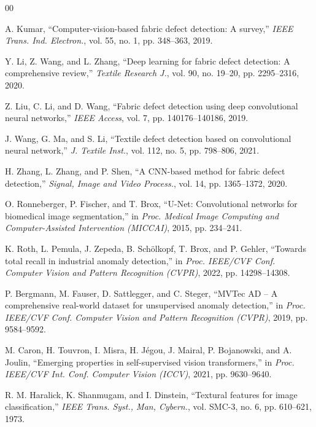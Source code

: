 \documentclass[journal]{IEEEtran}
\begin{document}
\balance
\begin{thebibliography}{00}

A. Kumar, ``Computer-vision-based fabric defect detection: A survey,'' \textit{IEEE Trans. Ind. Electron.}, vol. 55, no. 1, pp. 348--363, 2019.

Y. Li, Z. Wang, and L. Zhang, ``Deep learning for fabric defect detection: A comprehensive review,'' \textit{Textile Research J.}, vol. 90, no. 19--20, pp. 2295--2316, 2020.

Z. Liu, C. Li, and D. Wang, ``Fabric defect detection using deep convolutional neural networks,'' \textit{IEEE Access}, vol. 7, pp. 140176--140186, 2019.

J. Wang, G. Ma, and S. Li, ``Textile defect detection based on convolutional neural network,'' \textit{J. Textile Inst.}, vol. 112, no. 5, pp. 798--806, 2021.

H. Zhang, L. Zhang, and P. Shen, ``A CNN-based method for fabric defect detection,'' \textit{Signal, Image and Video Process.}, vol. 14, pp. 1365--1372, 2020.

O. Ronneberger, P. Fischer, and T. Brox, ``U-Net: Convolutional networks for biomedical image segmentation,'' in \textit{Proc. Medical Image Computing and Computer-Assisted Intervention (MICCAI)}, 2015, pp. 234--241.

K. Roth, L. Pemula, J. Zepeda, B. Sch\"olkopf, T. Brox, and P. Gehler, ``Towards total recall in industrial anomaly detection,'' in \textit{Proc. IEEE/CVF Conf. Computer Vision and Pattern Recognition (CVPR)}, 2022, pp. 14298--14308.

P. Bergmann, M. Fauser, D. Sattlegger, and C. Steger, ``MVTec AD -- A comprehensive real-world dataset for unsupervised anomaly detection,'' in \textit{Proc. IEEE/CVF Conf. Computer Vision and Pattern Recognition (CVPR)}, 2019, pp. 9584--9592.

M. Caron, H. Touvron, I. Misra, H. J\'egou, J. Mairal, P. Bojanowski, and A. Joulin, ``Emerging properties in self-supervised vision transformers,'' in \textit{Proc. IEEE/CVF Int. Conf. Computer Vision (ICCV)}, 2021, pp. 9630--9640.

R. M. Haralick, K. Shanmugam, and I. Dinstein, ``Textural features for image classification,'' \textit{IEEE Trans. Syst., Man, Cybern.}, vol. SMC-3, no. 6, pp. 610--621, 1973.


\end{thebibliography}
\end{document}
